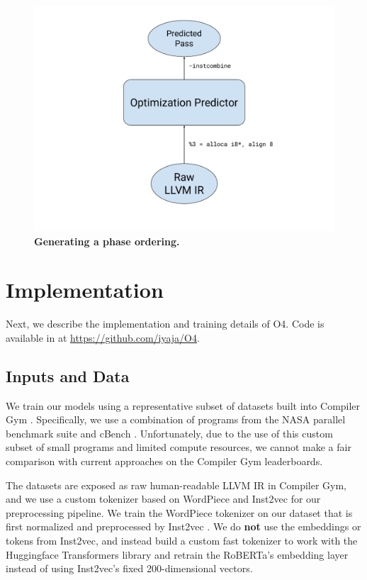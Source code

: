 \documentclass[conference]{IEEEtran}
\begin{document}
\label{fig:inference}
\begin{figure}
  \centering
  \includegraphics[scale=0.3]{figures/inference.pdf}
  \caption{\textbf{Generating a phase ordering.}}
\end{figure}

\section{Implementation}

Next, we describe the implementation and training details of O4. Code is
available in at \url{https://github.com/iyaja/O4}.

\subsection{Inputs and Data}

We train our models using a representative subset of datasets built into
Compiler Gym \cite{CompilerGym}. Specifically, we use a combination of programs
from the NASA parallel benchmark suite \cite{bailey1995parallel} and cBench
\cite{fursin2009collective}. Unfortunately, due to the use of this custom subset
of small programs and limited compute resources, we cannot make a fair
comparison with current approaches on the Compiler Gym leaderboards.

The datasets are exposed as raw human-readable LLVM IR in Compiler Gym, and we
use a custom tokenizer based on WordPiece \cite{devlin2018bert} and Inst2vec
\cite{ben2018neural} for our preprocessing pipeline. We train the WordPiece
tokenizer on our dataset that is first normalized and preprocessed by Inst2vec
\cite{ben2018neural}. We do \textbf{not} use the embeddings or tokens from
Inst2vec, and instead build a custom fast tokenizer to work with the Huggingface
Transformers library \cite{wolf2019huggingface} and retrain the RoBERTa's
embedding layer instead of using Inst2vec's fixed 200-dimensional vectors.
\end{document}
